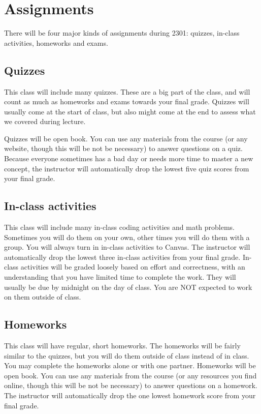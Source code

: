 \documentclass[10pt]{memoir}
\begin{document}
\section{Assignments}

There will be four major kinds of assignments during 2301: quizzes, in-class activities, homeworks and exams.

\subsection{\textbf{Quizzes}}

This class will include many quizzes. These are a big part of the class, and will count as much as homeworks and exams towards your final grade. Quizzes will usually come at the start of class, but also might come at the end to assess what we covered during lecture. 

Quizzes will be open book. You can use any materials from the course (or any website, though this will be not be necessary) to answer questions on a quiz. Because everyone sometimes has a bad day or needs more time to master a new concept, the instructor will automatically drop the lowest five quiz scores from your final grade. 

\subsection{\textbf{In-class activities}}
This class will include many in-class coding activities and math problems. Sometimes you will do them on your own, other times you will do them with a group. You will always turn in in-class activities to Canvas. The instructor will automatically drop the lowest three in-class activities from your final grade. In-class activities will be graded loosely based on effort and correctness, with an understanding that you have limited time to complete the work. They will usually be due by midnight on the day of class. You are NOT expected to work on them outside of class.

\subsection{\textbf{Homeworks}}
This class will have regular, short homeworks. The homeworks will be fairly similar to the quizzes, but you will do them outside of class instead of in class. You may complete the homeworks alone or with one partner. Homeworks will be open book. You can use any materials from the course (or any resources you find online, though this will be not be necessary) to answer questions on a homework. The instructor will automatically drop the one lowest homework score from your final grade.
\end{document}
